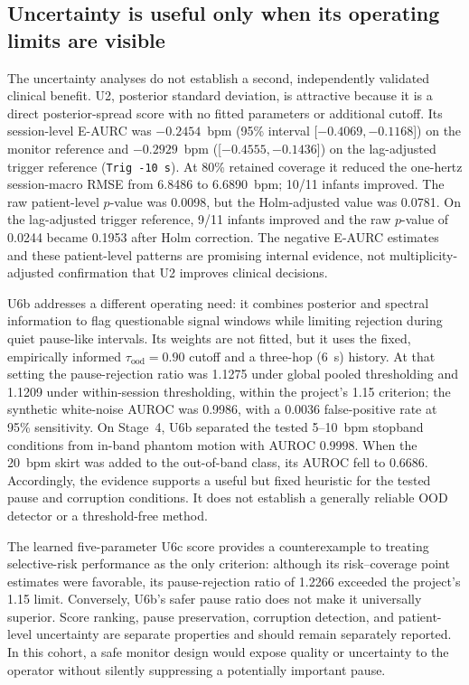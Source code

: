 \subsection{Uncertainty is useful only when its operating limits are visible}

The uncertainty analyses do not establish a second, independently validated clinical benefit.
U2, posterior standard deviation, is attractive because it is a direct posterior-spread score
with no fitted parameters or additional cutoff. Its session-level E-AURC was
$-0.2454$~bpm (95\% interval [$-0.4069,-0.1168$]) on the monitor reference and
$-0.2929$~bpm ([$-0.4555,-0.1436$]) on the lag-adjusted trigger reference (\texttt{Trig -10 s}).
At 80\% retained coverage it reduced the one-hertz session-macro RMSE from 6.8486 to
6.6890~bpm; 10/11 infants improved. The raw patient-level $p$-value was 0.0098, but the
Holm-adjusted value was 0.0781. On the lag-adjusted trigger reference, 9/11 infants improved and
the raw $p$-value of 0.0244 became 0.1953 after Holm correction. The negative E-AURC estimates
and these patient-level patterns are promising internal evidence, not multiplicity-adjusted
confirmation that U2 improves clinical decisions.

U6b addresses a different operating need: it combines posterior and spectral information to
flag questionable signal windows while limiting rejection during quiet pause-like intervals.
Its weights are not fitted, but it uses the fixed, empirically informed
$\tau_{\mathrm{ood}}=0.90$ cutoff and a three-hop (6~s) history. At that setting the pause-rejection
ratio was 1.1275 under global pooled thresholding and 1.1209 under within-session thresholding,
within the project's 1.15 criterion; the
synthetic white-noise AUROC was 0.9986, with a 0.0036 false-positive rate at 95\% sensitivity.
On Stage~4, U6b separated the tested 5--10~bpm stopband conditions from in-band phantom motion
with AUROC 0.9998. When the 20~bpm skirt was added to the out-of-band class, its AUROC fell to
0.6686. Accordingly, the evidence supports a useful but fixed heuristic for the tested pause
and corruption conditions. It does not establish a generally reliable OOD detector or a
threshold-free method.

The learned five-parameter U6c score provides a counterexample to treating selective-risk
performance as the only criterion: although its risk--coverage point estimates were favorable,
its pause-rejection ratio of 1.2266 exceeded the project's 1.15 limit. Conversely, U6b's safer
pause ratio does not make it universally superior. Score ranking, pause preservation, corruption
detection, and patient-level uncertainty are separate properties and should remain separately
reported. In this cohort, a safe monitor design would expose quality or uncertainty to the
operator without silently suppressing a potentially important pause.

